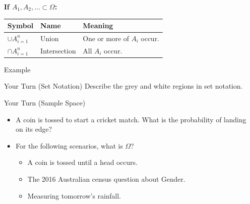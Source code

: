 \documentclass[t,xcolor=pdftex,dvipsnames,table]{beamer}
\def \setA{ (0,0) circle (1cm) }
\def \setB{ (1.5,0) circle (1cm) }
\def \setC{ (0.6,1.5) circle (1cm) }
\def \setO{ (-2, -1.5) rectangle (3.5, 2.75) }
\begin{document}
\begin{frame}[fragile]{}
\vspace{.5cm}
{\bf If $A_{1}, A_{2}, \ldots \subset \Omega$:} 

\vspace{.5cm}
\begin{tabular}{lll}
Symbol & Name & Meaning \\ \hline
$\cup A_{i=1}^{n}$ & Union & One or more of $A_{i}$ occur. \\
$\cap A_{i=1}^{n}$ & Intersection & All $A_{i}$ occur. \\
\end{tabular}
\end{frame}


\begin{frame}{Example}
\begin{alertblock}{Your Turn (Set Notation)}
Describe the grey and white regions in set notation.
\begin{center}
\end{center}
\end{alertblock}
\end{frame}


\begin{frame}{}
\begin{alertblock}{Your Turn (Sample Space)}
\begin{itemize}

\item A coin is tossed to start a cricket match. What is the probability of landing on its edge? \\

\item For the following scenarios, what is $\Omega$?

\begin{itemize} 
\item A coin is tossed until a head occurs. 
\item The 2016 Australian census question about Gender.
\item Measuring tomorrow's rainfall.
\end{itemize}
\end{itemize}

\end{alertblock}
\end{frame}
\end{document}
